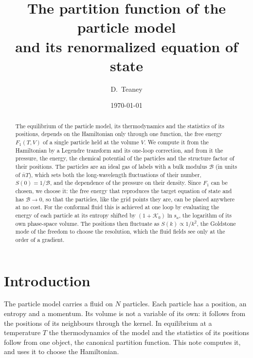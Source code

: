 \documentclass[11pt,aps,preprint,nofootinbib,superscriptaddress,tightenlines]{revtex4-2}
\newcommand{\klab}{\mathcal B}
\begin{document}
\title{The partition function of the particle model\\ and its renormalized equation of state}
\author{D.~Teaney}
\date{\today}

\begin{abstract}
The equilibrium of the particle model, its thermodynamics and the statistics of its positions, depends on the Hamiltonian only through one function, the
free energy $F_1(T,V)$ of a single particle held at the volume $V$.  We compute it from the Hamiltonian by a Legendre transform and its one-loop correction,
and from it the pressure, the energy, the chemical potential of the particles and the structure factor of their positions.  The particles are an ideal gas
of labels with a bulk modulus $\klab$ (in units of $\bar nT$), which sets both the long-wavelength fluctuations of their number, $S(0)=1/\klab$, and the dependence of the pressure on
their density.  Since $F_1$ can be chosen, we choose it: the free energy that reproduces the target equation of state and has $\klab\to0$, so that the
particles, like the grid points they are, can be placed anywhere at no cost.  For the conformal fluid this is achieved at one loop by evaluating the energy of
each particle at its entropy shifted by $(1+\mathcal K_0)\ln s_a$, the logarithm of its own phase-space volume.  The positions then fluctuate as
$S(k)\propto1/k^2$, the Goldstone mode of the freedom to choose the resolution, which the fluid fields see only at the order of a gradient.
\end{abstract}

\maketitle
\tableofcontents

\section{Introduction}
\label{sec:intro}

The particle model carries a fluid on $N$ particles.  Each particle has a position, an entropy and a momentum.  Its volume is not a variable of its own:
it follows from the positions of its neighbours through the kernel.  In equilibrium at a temperature $T$ the thermodynamics of the model and the statistics of
its positions follow from one object, the canonical partition function.  This note computes it, and uses it to choose the Hamiltonian.
\end{document}
